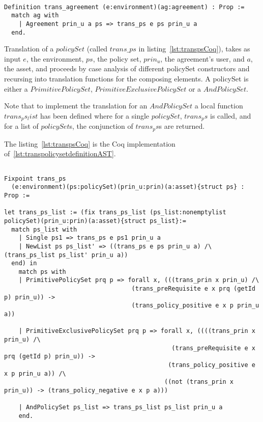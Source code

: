 \begin{minipage}[c]{0.95\textwidth}
\begin{lstlisting}

Definition trans_agreement (e:environment)(ag:agreement) : Prop :=
  match ag with 
    | Agreement prin_u a ps => trans_ps e ps prin_u a
  end.

\end{lstlisting}
\end{minipage}

Translation of a $policySet$ (called $trans\_ps$ in listing~\ref{lst:transpsCoq}), takes as input $e$, the environment, $ps$, the policy set, $prin_{u}$, the agreement's user, and $a$, the asset, and proceeds by case analysis of different policySet constructors and recursing into translation functions for the composing elements. A policySet is either a $PrimitivePolicySet$, $PrimitiveExclusivePolicySet$ or a $AndPolicySet$. 

Note that to implement the translation for an $AndPolicySet$ a local function $trans_ps_list$ has been defined where for a single $policySet$, $trans_ps$ is called, and for a list of $policySet$s, the conjunction of $trans_ps$s are returned.

The listing~\ref{lst:transpsCoq} is the Coq implementation of~\ref{lst:transpolicysetdefinitionAST}.

\begin{minipage}{\linewidth}
\begin{lstlisting}

Fixpoint trans_ps
  (e:environment)(ps:policySet)(prin_u:prin)(a:asset){struct ps} : Prop :=

let trans_ps_list := (fix trans_ps_list (ps_list:nonemptylist policySet)(prin_u:prin)(a:asset){struct ps_list}:=
  match ps_list with
    | Single ps1 => trans_ps e ps1 prin_u a
    | NewList ps ps_list' => ((trans_ps e ps prin_u a) /\ (trans_ps_list ps_list' prin_u a))
  end) in
    match ps with
    | PrimitivePolicySet prq p => forall x, (((trans_prin x prin_u) /\ 
                                   (trans_preRequisite e x prq (getId p) prin_u)) -> 
                                   (trans_policy_positive e x p prin_u a))  

    | PrimitiveExclusivePolicySet prq p => forall x, ((((trans_prin x prin_u) /\ 
                                              (trans_preRequisite e x prq (getId p) prin_u)) -> 
                                             (trans_policy_positive e x p prin_u a)) /\
                                            ((not (trans_prin x prin_u)) -> (trans_policy_negative e x p a)))
                   
    | AndPolicySet ps_list => trans_ps_list ps_list prin_u a
    end.
\end{lstlisting}
\end{minipage}




